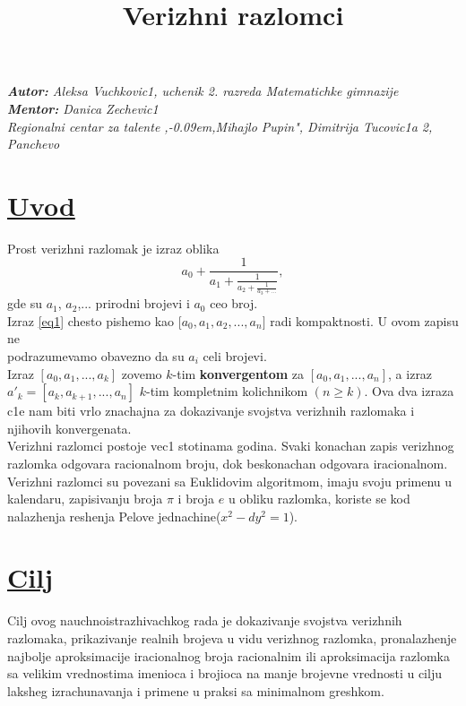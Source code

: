 \documentclass{article}
\title{\textbf{\huge Verizhni razlomci}}
\date{}
\author{}
\def \zn{,\kern-0.09em,}
\begin{document}
\setlength{\columnsep}{1.2cm}
\maketitle
\begin{center}
\vspace*{-1.5cm}
 \large\textit{\textbf{Autor:} Aleksa Vuchkovic1, uchenik 2. razreda Matematichke gimnazije}\\
    \textit{\textbf{Mentor:} Danica Zechevic1}\\
    \normalsize\textit{Regionalni centar za talente \zn Mihajlo Pupin", Dimitrija Tucovic1a 2, Panchevo}
\end{center}
\begin{multicols}{2}
 \noindent
\section*{\underline{Uvod}}
Prost verizhni razlomak je izraz oblika
\begin{equation}
\label{eq1}
    a_0+\frac{1}{a_1+\frac{1}{a_2+\frac{1}{a_3+\dots}}},\tag{$*$}
\end{equation}
gde su $a_1$, $a_2$,... prirodni brojevi i $a_0$ ceo broj.\\
Izraz \eqref{eq1} chesto pishemo kao [$a_0, a_1, a_2,...,a_n]$ radi kompaktnosti. U ovom zapisu ne \\\text podrazumevamo obavezno da su $a_i$ celi brojevi.\\
Izraz $[a_0,a_1,...,a_k]$ zovemo $k$-tim \textbf{konvergentom} za $[a_0,a_1,...,a_n]$, a izraz $a'_k=[a_k,a_{k+1},...,a_n]$ $k$-tim kompletnim kolichnikom $(n \geq k)$. Ova dva izraza c1e nam biti vrlo znachajna za dokazivanje svojstva verizhnih razlomaka i njihovih konvergenata.\\
Verizhni razlomci postoje vec1 stotinama godina. Svaki konachan zapis verizhnog
razlomka odgovara racionalnom broju, dok beskonachan odgovara \text iracionalnom.
Verizhni razlomci su povezani sa Euklidovim algoritmom, imaju svoju primenu u
kalendaru, zapisivanju broja $\pi$ i broja $e$ u obliku razlomka, koriste se kod nalazhenja reshenja Pelove jednachine($x^2-dy^2=1$).

\section*{\underline{Cilj}}
Cilj ovog nauchnoistrazhivachkog rada je \text dokazivanje svojstva verizhnih razlomaka, prikazivanje \text realnih brojeva u vidu verizhnog razlomka, pronalazhenje \text najbolje aproksimacije iracionalnog broja racionalnim ili aproksimacija razlomka sa velikim vrednostima imenioca i brojioca na manje brojevne vrednosti u cilju laksheg izrachunavanja i primene u praksi sa minimalnom greshkom.


\end{multicols}
\end{document}
